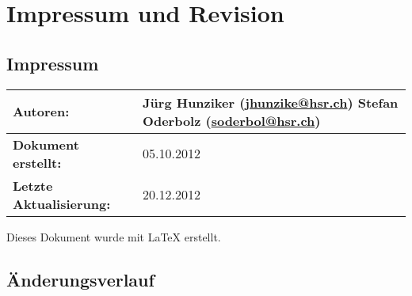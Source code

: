 \chapter*{Impressum und Revision}

\section*{Impressum}
\begin{table}[H] 
\centering 
\begin{tabular}{|p{0.35\twocelltabwidth}|p{0.65\twocelltabwidth}|}
\hline 
\textbf{Autoren:} & Jürg Hunziker (\url{jhunzike@hsr.ch}) \newline
Stefan Oderbolz (\url{soderbol@hsr.ch}) \\ 
\hline 
\textbf{Dokument erstellt:} & 05.10.2012 \\ 
\hline 
\textbf{Letzte Aktualisierung:} & 20.12.2012 \\ 
\hline 
\end{tabular}
\end{table}

Dieses Dokument wurde mit \LaTeX{} erstellt.

\section*{Änderungsverlauf}

